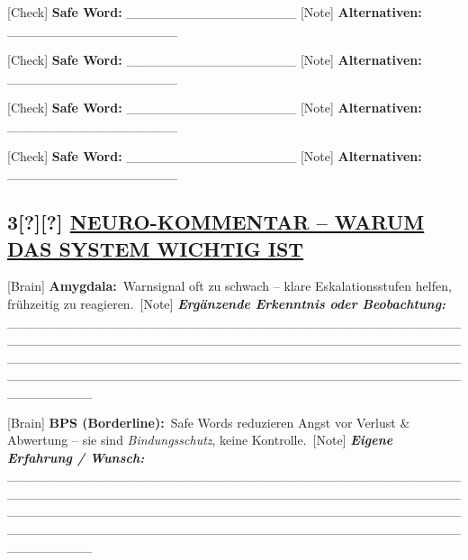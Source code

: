[Check] \textbf{Safe Word:} \_\_\_\_\_\_\_\_\_\_\_\_\_\_\_\_\_\_ [Note] \textbf{Alternativen:} \_\_\_\_\_\_\_\_\_\_\_\_\_\_\_\_\_\_

[Check] \textbf{Safe Word:} \_\_\_\_\_\_\_\_\_\_\_\_\_\_\_\_\_\_ [Note] \textbf{Alternativen:} \_\_\_\_\_\_\_\_\_\_\_\_\_\_\_\_\_\_

[Check] \textbf{Safe Word:} \_\_\_\_\_\_\_\_\_\_\_\_\_\_\_\_\_\_ [Note] \textbf{Alternativen:} \_\_\_\_\_\_\_\_\_\_\_\_\_\_\_\_\_\_

[Check] \textbf{Safe Word:} \_\_\_\_\_\_\_\_\_\_\_\_\_\_\_\_\_\_ [Note] \textbf{Alternativen:} \_\_\_\_\_\_\_\_\_\_\_\_\_\_\_\_\_\_

\hypertarget{section-2}{%
\subsection{}\label{section-2}}

\hypertarget{neuro-kommentar-warum-das-system-wichtig-ist}{%
\subsection{\texorpdfstring{\textbf{3[?][?] \ul{NEURO-KOMMENTAR -- WARUM DAS SYSTEM WICHTIG IST}}}{3[?][?] NEURO-KOMMENTAR -- WARUM DAS SYSTEM WICHTIG IST}}\label{neuro-kommentar-warum-das-system-wichtig-ist}}

[Brain] \textbf{Amygdala:}\
Warnsignal oft zu schwach -- klare Eskalationsstufen helfen, frühzeitig zu reagieren.\
[Note] \emph{\textbf{Ergänzende Erkenntnis oder Beobachtung:}} \_\_\_\_\_\_\_\_\_\_\_\_\_\_\_\_\_\_\_\_\_\_\_\_\_\_\_\_\_\_\_\_\_\_\_\_\_\_\_\_\_\_\_\_\_\_\_\_\_\_\_\_\_\_\_\_\_\_\_\_\_\_\_\_\_\_\_\_\_\_\_\_\_\_\_\_\_\_\_\_\_\_\_\_\_\_\_\_\_\_\_\_\_\_\_\_\_\_\_\_\_\_\_\_\_\_\_\_\_\_\_\_\_\_\_\_\_\_\_\_\_\_\_\_\_\_\_\_\_\_\_\_\_\_\_\_\_\_\_\_\_\_\_\_\_\_\_\_\_\_\_\_\_\_\_\_\_\_\_\_\_\_\_\_\_\_\_\_\_\_\_\_\_\_\_\_\_\_\_\_\_\_\_\_\_\_\_\_\_\_\_\_\_\_\_\_\_\_\_\_\_

[Brain] \textbf{BPS (Borderline):}\
Safe Words reduzieren Angst vor Verlust \& Abwertung -- sie sind \emph{Bindungsschutz}, keine Kontrolle.\
[Note] \emph{\textbf{Eigene Erfahrung / Wunsch:}} \_\_\_\_\_\_\_\_\_\_\_\_\_\_\_\_\_\_\_\_\_\_\_\_\_\_\_\_\_\_\_\_\_\_\_\_\_\_\_\_\_\_\_\_\_\_\_\_\_\_\_\_\_\_\_\_\_\_\_\_\_\_\_\_\_\_\_\_\_\_\_\_\_\_\_\_\_\_\_\_\_\_\_\_\_\_\_\_\_\_\_\_\_\_\_\_\_\_\_\_\_\_\_\_\_\_\_\_\_\_\_\_\_\_\_\_\_\_\_\_\_\_\_\_\_\_\_\_\_\_\_\_\_\_\_\_\_\_\_\_\_\_\_\_\_\_\_\_\_\_\_\_\_\_\_\_\_\_\_\_\_\_\_\_\_\_\_\_\_\_\_\_\_\_\_\_\_\_\_\_\_\_\_\_\_\_\_\_\_\_\_\_\_\_\_\_\_\_\_\_\_

